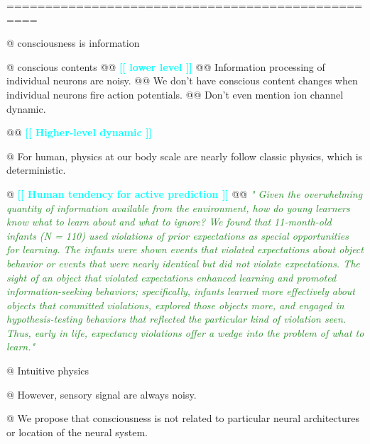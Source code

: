 \documentclass[utf8]{article}
\newenvironment{ants}
			{
			 \begin{easylist}[itemize]
			}
			{
			\end{easylist}
			}
\newcommand{\rewrite}[1]{\textcolor{ForestGreen}{\textit{"#1"}}\newline}
\newcommand{\needref}[1]{%
			\ifthenelse{\equal{#1}{}}{%
				\todo[color=White, linecolor=BlueViolet]{\textcolor{BlueViolet}{Ref}}}{%
				\todo[color=White, linecolor=BlueViolet]{\textcolor{BlueViolet}{Ref: #1}}%
				}%
		}
\newcommand{\toWrite}[1]{\noindent
			\textcolor{Cyan}{\textbf{[[ #1 ]]}}}
\begin{document}
		==================================================
		\begin{ants}
			
			@ consciousness is information
			
			@ conscious contents
				@@ \toWrite{lower level}
				@@ Information processing of individual neurons are noisy.
				@@ We don't have conscious content changes when individual neurons fire action potentials. 				
				@@ Don't even mention ion channel dynamic. 
				
				
				@@ \toWrite{Higher-level dynamic}

				
				
				
				
			
			@ For human, physics at our body scale are nearly follow classic physics, which is deterministic. 
			
			
			@ \toWrite{Human tendency for active prediction }
				@@ \cite{Stahl2015} \rewrite{
					Given the overwhelming quantity of information available from the environment, how do young learners know what to learn about and what to ignore? We found that 11-month-old infants (N = 110) used violations of prior expectations as special opportunities for learning. The infants were shown events that violated expectations about object behavior or events that were nearly identical but did not violate expectations. The sight of an object that violated expectations enhanced learning and promoted information-seeking behaviors; specifically, infants learned more effectively about objects that committed violations, explored those objects more, and engaged in hypothesis-testing behaviors that reflected the particular kind of violation seen. Thus, early in life, expectancy violations offer a wedge into the problem of what to learn.}
			
			@ Intuitive physics \needref{Intuitive physics}
			
			@ However, sensory signal are always noisy. 			
			
			
			@ We propose that consciousness is not related to particular neural architectures or location of the neural system.
			

		\end{ants}
	
	
	
	
	
	
\end{document}

